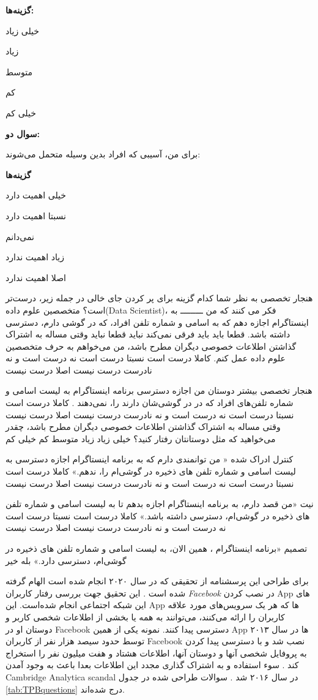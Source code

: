 \textbf{گزینه‌ها:}

خیلی زیاد

زیاد

متوسط

کم

خیلی کم

\textbf{سوال دو:}

برای من، آسیبی که افراد بدین وسیله متحمل می‌شوند: 

\textbf{گزینه‌ها}

خیلی اهمیت دارد

نسبتا اهمیت دارد

نمی‌دانم

زیاد اهمیت ندارد

اصلا اهمیت ندارد

هنجار تخصصی
به نظر شما کدام گزینه برای پر کردن جای خالی در جمله زیر، درست‌تر است؟
متخصصین علوم داده(Data Scientist)، فکر می کنند که من ـــــــــ به اینستاگرام اجازه دهم که به اسامی و شماره تلفن‌ افراد، که در گوشی دارم، دسترسی داشته باشد. 
قطعا باید
باید
فرقی نمی‌کند
نباید
قطعا نباید
وقتی مساله به اشتراک گذاشتن اطلاعات خصوصی دیگران مطرح باشد، من می‌خواهم به حرف متخصصین علوم داده عمل کنم. 
کاملا درست است
نسبتا درست است
نه درست است و نه نادرست
درست نیست
اصلا درست نیست

هنجار تخصصی
بیشتر دوستان من اجازه دسترسی برنامه اینستاگرام به لیست اسامی و شماره تلفن‌‌های افراد که در در گوشی‌شان دارند را، نمی‌دهند . 
کاملا درست است
نسبتا درست است
نه درست است و نه نادرست
درست نیست
اصلا درست نیست
وقتی مساله به اشتراک گذاشتن اطلاعات خصوصی دیگران مطرح باشد، چقدر می‌خواهید که
مثل دوستانتان رفتار کنید؟ 
خیلی زیاد
زیاد
متوسط
کم
خیلی کم

کنترل ادراک شده
« من توانمندی دارم که به برنامه اینستاگرام اجازه دسترسی به لیست اسامی و شماره تلفن های ذخیره در گوشی‌ام را، ندهم.» 
کاملا درست است
نسبتا درست است
نه درست است و نه نادرست
درست نیست
اصلا درست نیست

نیت
«من قصد دارم، به برنامه اینستاگرام اجازه بدهم تا به لیست اسامی و شماره تلفن های ذخیره در گوشی‌ام، دسترسی داشته باشد.» 
کاملا درست است
نسبتا درست است
نه درست است و نه نادرست
درست نیست
اصلا درست نیست

تصمیم
«برنامه اینستاگرام ، همین الان، به لیست اسامی و شماره تلفن های ذخیره در گوشی‌ام، دسترسی دارد.» 
بله
خیر

برای طراحی این پرسشنامه از تحقیقی که در سال ۲۰۲۰ انجام شده است الهام گرفته شده است
\!\citep{vanderschyffInformationPrivacyBehavior2020a}.
این تحقیق جهت بررسی رفتار کاربران
\textit{\gls{Facebook}}
در نصب  کردن
\gls{App}
\!‌های
این شبکه اجتماعی انجام شده‌است. این
\gls{App}
\!‌ها
که هر یک سرویس‌های مورد علاقه کاربران را ارائه می‌کنند، می‌توانند به همه یا بخشی از اطلاعات شخصی
کاربر و دوستان او در
\gls{Facebook}
دسترسی پیدا کنند. نمونه یکی از همین
\gls{App}
\!‌ها
در سال ۲۰۱۳ توسط حدود سیصد هزار نفر از کاربران
\gls{Facebook}
نصب شد و با دسترسی پیدا کردن به پروفایل شخصی آنها و دوستان آنها،
اطلاعات هشتاد و هفت میلیون‌ نفر را استخراج کند
\citep{confessoreCambridgeAnalyticaFacebook2018,salinasZuckerbergCambridgeAnalytica,smithThereOpenSecret}.
سوء استفاده و به اشتراک گذاری مجدد این اطلاعات بعدا باعث
به وجود آمدن
\gls{Cambridge Analytica scandal}
در سال ۲۰۱۶ شد
\!\citep{gonzalezGlobalReactionsCambridge2019,SuspendingCambridgeAnalytica2018}.
سوالات طراحی شده در جدول
\eqref{tab:TPBquestions}
درج شده‌اند.

